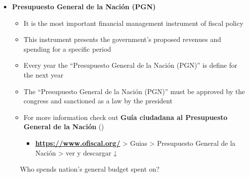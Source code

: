 \documentclass[
  ignorenonframetext,
]{beamer}
\providecommand{\tightlist}{%
  \setlength{\itemsep}{0pt}\setlength{\parskip}{0pt}}\usepackage{longtable,booktabs,array}
\begin{document}
\begin{frame}{}
\label{section-21}
\begin{itemize}
\item
  \textbf{Presupuesto General de la Nación (PGN)}

  \begin{itemize}
  \item
    It is the most important financial management instrument of fiscal
    policy
  \item
    This instrument presents the government's proposed revenues and
    spending for a specific period
  \item
    Every year the ``Presupuesto General de la Nación (PGN)'' is define
    for the next year
  \item
    The ``Presupuesto General de la Nación (PGN)'' must be approved by
    the congress and sanctioned as a law by the president
  \item
    For more information check out \textbf{Guía ciudadana al Presupuesto
    General de la Nación}
    ()

    \begin{itemize}
    \tightlist
    \item
      \href{https://www.ofiscal.org/}{\textbf{https://www.ofiscal.org/}}
      \textgreater{} Guias \textgreater{} Presupuesto General de la
      Nación \textgreater{} ver y descargar ↓
    \end{itemize}
  \end{itemize}
\end{itemize}
\end{frame}

\begin{frame}{}
\label{section-22}
\begin{figure}


\caption{\label{fig-pgn-col}Who spends nation's general budget spent
on?}

\end{figure}%
\end{frame}
\end{document}

